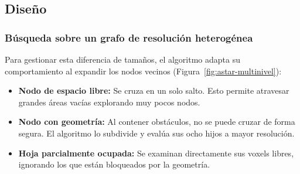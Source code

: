 \subsection{Diseño}

\subsubsection{Búsqueda sobre un grafo de resolución heterogénea}

Para gestionar esta diferencia de tamaños, el algoritmo adapta su comportamiento al expandir los nodos vecinos (Figura~\ref{fig:astar-multinivel}):

\begin{itemize}
    \item \textbf{Nodo de espacio libre:} Se cruza en un solo salto.
    Esto permite atravesar grandes áreas vacías explorando muy pocos nodos.
    \item \textbf{Nodo con geometría:} Al contener obstáculos, no se puede cruzar de forma segura.
    El algoritmo lo subdivide y evalúa sus ocho hijos a mayor resolución.
    \item \textbf{Hoja parcialmente ocupada:} Se examinan directamente sus \glspl{voxel} libres, ignorando los que están bloqueados por la geometría.
\end{itemize}

